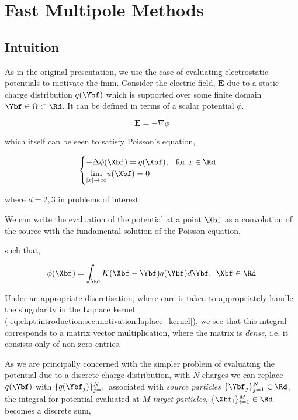 
\section{Fast Multipole Methods}\label{chpt:fmm:sec:generic}

\subsection{Intuition}\label{chpt:fmm:sec:generic:sub:intuition}

As in the original presentation, we use the case of evaluating electrostatic potentials to motivate the \acrshort{fmm}. Consider the electric field, $\mathbf{E}$ due to a static charge distribution $q(\Ybf)$ which is supported over some finite domain $\Ybf \in \Omega \subset \Rd$. It can be defined in terms of a scalar potential $\phi$.

\begin{equation*}
\mathbf{E} = -\nabla \phi
\end{equation*}

which itself can be seen to satisfy Poisson's equation,

\begin{equation*}
    \begin{cases}
        - \Delta \phi(\Xbf) = q(\Xbf), \> \> \text{  for } x\in \Rd \\
        \underset{|x| \rightarrow \infty}{\lim } u(\Xbf) = 0
    \end{cases}
\end{equation*}


where $d=2,3$ in problems of interest.

We can write the evaluation of the potential at a point $\Xbf$ as a convolution of the source with the fundamental solution of the Poisson equation,

such that,

\begin{equation}
\phi(\Xbf) = \int_{\Rd} K(\Xbf-\Ybf)q(\Ybf) d\Ybf, \> \> \Xbf \in \Rd
\end{equation}\label{eq:chpt:fmm:laplace_potential_integral}

Under an appropriate discretisation, where care is taken to appropriately handle the singularity in the Laplace kernel (\ref{eq:chpt:introduction:sec:motivation:laplace_kernel}), we see that this integral corresponds to a matrix vector multiplication, where the matrix is \textit{dense}, i.e. it consists only of non-zero entries.

As we are principally concerned with the simpler problem of evaluating the potential due to a discrete charge distribution, with $N$ charges we can replace $q(\Ybf)$ with $\{ q(\Ybf_j) \}_{j=1}^N$ associated with \textit{source particles} $\{\Ybf_j\}_{j=1}^N \in \Rd$, the integral for potential evaluated at $M$ \textit{target particles}, $\{\Xbf_i \}_{i=1}^M \in \Rd$ becomes a discrete sum,

